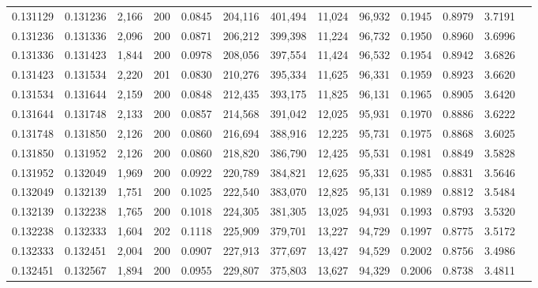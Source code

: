 \begin{tabular}{rrrrrrrrrrrrr}
0.131129 & 0.131236 &  2,166 & 200 &                                     0.0845 & 204,116 & 401,494 &  11,024 &  96,932 & 0.1945 & 0.8979 & 3.7191 \\
0.131236 & 0.131336 &  2,096 & 200 &                                     0.0871 & 206,212 & 399,398 &  11,224 &  96,732 & 0.1950 & 0.8960 & 3.6996 \\
0.131336 & 0.131423 &  1,844 & 200 &                                     0.0978 & 208,056 & 397,554 &  11,424 &  96,532 & 0.1954 & 0.8942 & 3.6826 \\
0.131423 & 0.131534 &  2,220 & 201 &                                     0.0830 & 210,276 & 395,334 &  11,625 &  96,331 & 0.1959 & 0.8923 & 3.6620 \\
0.131534 & 0.131644 &  2,159 & 200 &                                     0.0848 & 212,435 & 393,175 &  11,825 &  96,131 & 0.1965 & 0.8905 & 3.6420 \\
0.131644 & 0.131748 &  2,133 & 200 &                                     0.0857 & 214,568 & 391,042 &  12,025 &  95,931 & 0.1970 & 0.8886 & 3.6222 \\
0.131748 & 0.131850 &  2,126 & 200 &                                     0.0860 & 216,694 & 388,916 &  12,225 &  95,731 & 0.1975 & 0.8868 & 3.6025 \\
0.131850 & 0.131952 &  2,126 & 200 &                                     0.0860 & 218,820 & 386,790 &  12,425 &  95,531 & 0.1981 & 0.8849 & 3.5828 \\
0.131952 & 0.132049 &  1,969 & 200 &                                     0.0922 & 220,789 & 384,821 &  12,625 &  95,331 & 0.1985 & 0.8831 & 3.5646 \\
0.132049 & 0.132139 &  1,751 & 200 &                                     0.1025 & 222,540 & 383,070 &  12,825 &  95,131 & 0.1989 & 0.8812 & 3.5484 \\
0.132139 & 0.132238 &  1,765 & 200 &                                     0.1018 & 224,305 & 381,305 &  13,025 &  94,931 & 0.1993 & 0.8793 & 3.5320 \\
0.132238 & 0.132333 &  1,604 & 202 &                                     0.1118 & 225,909 & 379,701 &  13,227 &  94,729 & 0.1997 & 0.8775 & 3.5172 \\
0.132333 & 0.132451 &  2,004 & 200 &                                     0.0907 & 227,913 & 377,697 &  13,427 &  94,529 & 0.2002 & 0.8756 & 3.4986 \\
0.132451 & 0.132567 &  1,894 & 200 &                                     0.0955 & 229,807 & 375,803 &  13,627 &  94,329 & 0.2006 & 0.8738 & 3.4811 \\

\end{tabular}
